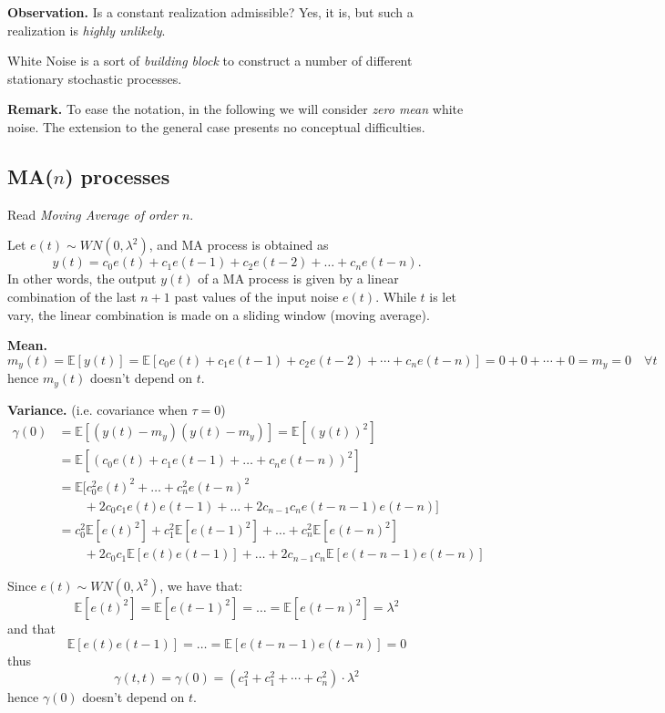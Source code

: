 \documentclass[10pt,a4paper,twoside,openright]{book}
\begin{document}
\textbf{Observation.} Is a constant realization admissible? Yes, it is, but such a realization is \emph{highly unlikely}.

White Noise is a sort of \emph{building block} to construct a number of different stationary stochastic processes.

\textbf{Remark.} To ease the notation, in the following we will consider \emph{zero mean} white noise. The extension to the general case presents no conceptual difficulties.

\subsection{MA(\texorpdfstring{$n$}{n}) processes}

Read \emph{Moving Average of order $n$}.

Let $e(t) \sim W N(0, \lambda^{2})$, and MA process is obtained as
\[
	\boxed{y(t)=c_{0} e(t)+c_{1} e(t-1)+c_{2} e(t-2)+\ldots+c_{n} e(t-n).}
\]
In other words, the output $y(t)$ of a MA process is given by a linear combination of the last $n+1$ past values of the input noise $e(t)$.
While $t$ is let vary, the linear combination is made on a sliding window (moving average).

\textbf{Mean.}
\[
	m_{y}(t)=\mathbb{E}[y(t)] = \mathbb{E}[c_{0} e(t)+c_{1} e(t-1)+c_{2} e(t-2)+\cdots+c_{n} e(t-n)] = 0+0+\cdots+0=m_{y}=0 \quad \forall t
\]
hence $m_{y}(t)$ doesn't depend on $t$.

\textbf{Variance.} (i.e. covariance when $\tau =0$)
\begin{align*}
	\gamma (0)&=\mathbb{E}[(y(t)-m_{y})(y(t)-m_{y})]=\mathbb{E}[(y(t))^2]\\
	&=\mathbb{E}[(c_{0} e(t)+c_{1} e(t-1)+\ldots+c_{n} e(t-n))^{2}]\\
	&=\mathbb{E}[c_{0}^{2} e(t)^{2}+\ldots+c_{n}^{2} e(t-n)^{2}\\
	&\qquad+2 c_{0} c_{1} e(t) e(t-1)+\ldots+2 c_{n-1} c_{n} e(t-n-1) e(t-n)]\\
	&=c_{0}^{2} \mathbb{E}[e(t)^{2}]+c_{1}^{2} \mathbb{E}[e(t-1)^{2}]+\ldots+c_{n}^{2} \mathbb{E}[e(t-n)^{2}]\\
	&\qquad+2 c_{0} c_{1} \mathbb{E}[e(t) e(t-1)]+\ldots+2 c_{n-1} c_{n} \mathbb{E}[e(t-n-1) e(t-n)]
\end{align*}

Since $e(t) \sim W N(0, \lambda^{2})$, we have that:
$$
\mathbb{E}[e(t)^{2}]=\mathbb{E}[e(t-1)^{2}]=\ldots=\mathbb{E}[e(t-n)^{2}]=\lambda^{2}
$$
and that
$$
\mathbb{E}[e(t) e(t-1)]=\ldots=\mathbb{E}[e(t-n-1) e(t-n)]=0
$$
thus
\[
	\boxed{\gamma (t,t)=\gamma (0)=(c_{1}^2 +c_{1}^2 +\cdots+c_{n}^2 )\cdot\lambda^2}
\]
hence $\gamma (0)$ doesn't depend on $t$.
\end{document}
